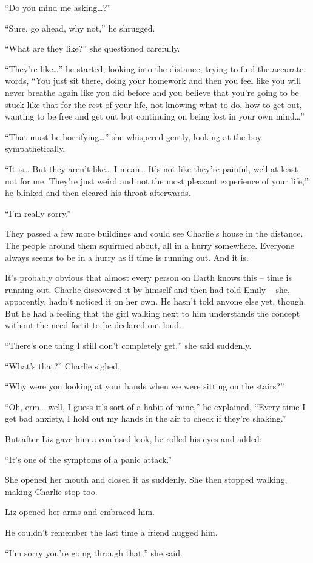 “Do you mind me asking…?”

“Sure, go ahead, why not,” he shrugged.

“What are they like?” she questioned carefully.

“They’re like…” he started, looking into the distance, trying to find the accurate words, “You just sit there, doing your homework and then you feel like you will never breathe again like you did before and you believe that you’re going to be stuck like that for the rest of your life, not knowing what to do, how to get out, wanting to be free and get out but continuing on being lost in your own mind…”

“That must be horrifying…” she whispered gently, looking at the boy sympathetically.

“It is… But they aren’t like… I mean… It’s not like they’re painful, well at least not for me. They’re just weird and not the most pleasant experience of your life,” he blinked and then cleared his throat afterwards.

“I’m really sorry.”

They passed a few more buildings and could see Charlie’s house in the distance. The people around them squirmed about, all in a hurry somewhere. Everyone always seems to be in a hurry as if time is running out. And it is.

It’s probably obvious that almost every person on Earth knows this – time is running out. Charlie discovered it by himself and then had told Emily – she, apparently, hadn’t noticed it on her own. He hasn’t told anyone else yet, though. But he had a feeling that the girl walking next to him understands the concept without the need for it to be declared out loud.

“There’s one thing I still don’t completely get,” she said suddenly.

“What’s that?” Charlie sighed.

“Why were you looking at your hands when we were sitting on the stairs?”

“Oh, erm… well, I guess it’s sort of a habit of mine,” he explained, “Every time I get bad anxiety, I hold out my hands in the air to check if they’re shaking.”

But after Liz gave him a confused look, he rolled his eyes and added:

“It’s one of the symptoms of a panic attack.”

She opened her mouth and closed it as suddenly. She then stopped walking, making Charlie stop too.

Liz opened her arms and embraced him.

He couldn’t remember the last time a friend hugged him.

“I’m sorry you’re going through that,” she said.